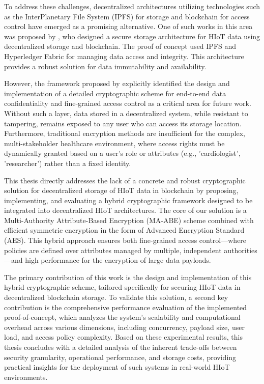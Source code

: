 \documentclass[cic,tc,english]{iiufrgs}
\numberwithin{algorithm}{chapter}
\begin{document}
    To address these challenges, decentralized architectures utilizing technologies such as the InterPlanetary File System (IPFS) for storage and blockchain for access control have emerged as a promising alternative. One of such works in this area was proposed by \citet{laura2023}, who designed a secure storage architecture for HIoT data using decentralized storage and blockchain. The proof of concept used IPFS \cite{benet2013ipfs} and Hyperledger Fabric \cite{fabric} for managing data access and integrity. This architecture provides a robust solution for data immutability and availability.

    However, the framework proposed by \citet{laura2023} explicitly identified the design and implementation of a detailed cryptographic scheme for end-to-end data confidentiality and fine-grained access control as a critical area for future work. Without such a layer, data stored in a decentralized system, while resistant to tampering, remains exposed to any user who can access its storage location. Furthermore, traditional encryption methods are insufficient for the complex, multi-stakeholder healthcare environment, where access rights must be dynamically granted based on a user's role or attributes (e.g., 'cardiologist', 'researcher') rather than a fixed identity.

    This thesis directly addresses the lack of a concrete and robust cryptographic solution for decentralized storage of HIoT data in blockchain by proposing, implementing, and evaluating a hybrid cryptographic framework designed to be integrated into decentralized HIoT architectures. The core of our solution is a Multi-Authority Attribute-Based Encryption (MA-ABE) scheme combined with efficient symmetric encryption in the form of Advanced Encryption Standard (AES). This hybrid approach ensures both fine-grained access control—where policies are defined over attributes managed by multiple, independent authorities—and high performance for the encryption of large data payloads.

    The primary contribution of this work is the design and implementation of this hybrid cryptographic scheme, tailored specifically for securing HIoT data in decentralized blockchain storage. To validate this solution, a second key contribution is the comprehensive performance evaluation of the implemented proof-of-concept, which analyzes the system's scalability and computational overhead across various dimensions, including concurrency, payload size, user load, and access policy complexity. Based on these experimental results, this thesis concludes with a detailed analysis of the inherent trade-offs between security granularity, operational performance, and storage costs, providing practical insights for the deployment of such systems in real-world HIoT environments.
\end{document}
